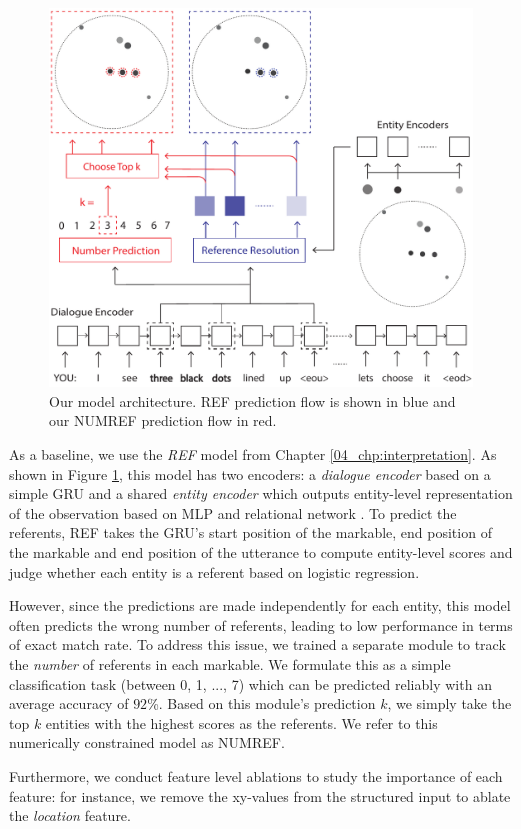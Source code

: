 \begin{figure}[ht]
\centering
\includegraphics[width=0.7\columnwidth]{model_architecture.pdf}
\caption{Our model architecture. REF prediction flow is shown in blue and our NUMREF prediction flow in red.}
\label{05_fig:model_architecture}
\end{figure}

As a baseline, we use the \textit{REF} model from Chapter \ref{04_chp:interpretation}. As shown in Figure \ref{05_fig:model_architecture}, this model has two encoders: a \textit{dialogue encoder} based on a simple GRU \citep{cho2014properties} and a shared \textit{entity encoder} which outputs entity-level representation of the observation based on MLP and relational network \citep{santoro2017simple}. To predict the referents, REF takes the GRU's start position of the markable, end position of the markable and end position of the utterance to compute entity-level scores and judge whether each entity is a referent based on logistic regression.

However, since the predictions are made independently for each entity, this model often predicts the wrong number of referents, leading to low performance in terms of exact match rate. To address this issue, we trained a separate module to track the \textit{number} of referents in each markable. We formulate this as a simple classification task (between 0, 1, ..., 7) which can be predicted reliably with an average accuracy of $92$\%. Based on this module's prediction $k$, we simply take the top $k$ entities with the highest scores as the referents. We refer to this numerically constrained model as NUMREF.

Furthermore, we conduct feature level ablations to study the importance of each feature: for instance, we remove the xy-values from the structured input to ablate the \textit{location} feature.

